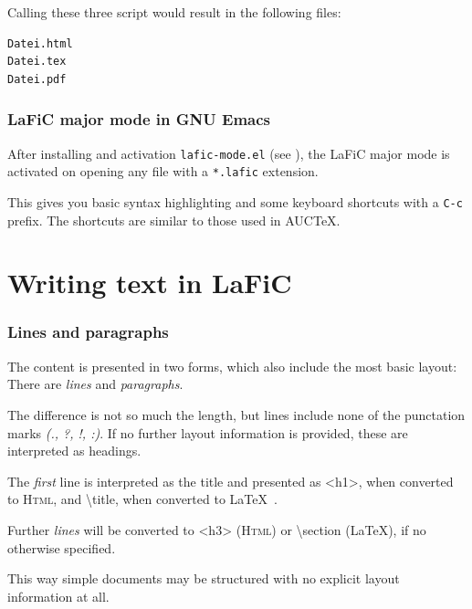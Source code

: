\documentclass{article}
\begin{document}
{Calling these three script would result in the following
files:\\}

\begin{verbatim}
Datei.html
Datei.tex
Datei.pdf
\end{verbatim}


\section{LaFiC major mode in GNU Emacs}

{After installing and activation \texttt{lafic-mode.el} (see
\xspace ), the LaFiC major mode is activated on opening
any file with a \texttt{*.lafic} extension.\\}

{This gives you basic syntax highlighting and some keyboard
shortcuts with a \texttt{C-c} prefix. The shortcuts are similar to
those used in AUCTeX.\\}

\part{Writing text in LaFiC}
\label{Writing}

\section{Lines and paragraphs}

{The content is presented in two forms, which also include
the most basic layout: There are \emph{lines} and \emph{paragraphs}.\\}

{The difference is not so much the length, but lines include
none of the punctation marks \emph{(., ?, !, :)}. If no
further layout information is provided, these are
interpreted as headings.\\}

{The \emph{first} line is interpreted as the title and presented as
 <h1>, when converted to \textsc{Html}, and \textbackslash title, when 
converted to \LaTeX\ .\\}

{Further \emph{lines} will be converted to <h3> (\textsc{Html}) or \textbackslash section
(LaTeX), if no otherwise specified.\\}

{This way simple documents may be structured with no explicit
layout information at all.\\}
\end{document}
